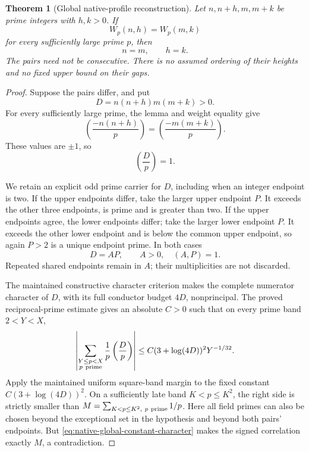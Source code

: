 \documentclass[11pt]{article}
\newtheorem{theorem}{Theorem}[section]
\begin{document}
\begin{theorem}[Global native-profile reconstruction]
\label{thm:native-global-inverse}
Let \(n,n+h,m,m+k\) be prime integers with \(h,k>0\).
If
\[
                     W_p(n,h)=W_p(m,k)
\]
for every sufficiently large prime \(p\), then
\[
                              n=m,\qquad h=k.
\]
The pairs need not be consecutive. There is no assumed ordering of
their heights and no fixed upper bound on their gaps.
\end{theorem}
\begin{proof}
Suppose the pairs differ, and put
\[
                         D=n(n+h)m(m+k)>0.
\]
For every sufficiently large prime, the lemma and weight equality give
\[
 \left(\frac{-n(n+h)}p\right)
                      =\left(\frac{-m(m+k)}p\right).
\]
These values are \(\pm1\), so
\begin{equation}\label{eq:native-global-constant-character}
                            \left(\frac Dp\right)=1.
\end{equation}

We retain an explicit odd prime carrier for \(D\), including when an
integer endpoint is two. If the upper endpoints differ, take the
larger upper endpoint \(P\). It exceeds the other three endpoints,
is prime and is greater than two. If the upper endpoints agree,
the lower endpoints differ; take the larger lower endpoint \(P\).
It exceeds the other lower endpoint and is below the common upper
endpoint, so again \(P>2\) is a unique endpoint prime.
In both cases
\[
                       D=AP,\qquad A>0,\quad (A,P)=1.
\]
Repeated shared endpoints remain in \(A\); their multiplicities
are not discarded.

The maintained constructive character criterion makes the complete
numerator character of \(D\), with its full conductor budget \(4D\),
nonprincipal. The proved reciprocal-prime estimate gives an absolute
\(C>0\) such that on every prime band \(2<Y<X\),
\[
 \left|\sum_{\substack{Y\le p<X\\p\ {\rm prime}}}
                  \frac1p\left(\frac Dp\right)\right|
       \le C(3+\log(4D))^2Y^{-1/32}.
\]
Apply the maintained uniform square-band margin to the fixed
constant \(C(3+\log(4D))^2\). On a sufficiently late band
\(K<p\le K^2\), the right side is strictly smaller than
\(M=\sum_{K<p\le K^2,\ p\ {\rm prime}}1/p\).
Here all field primes can also be chosen beyond the exceptional
set in the hypothesis and beyond both pairs' endpoints.
But \eqref{eq:native-global-constant-character} makes the signed
correlation exactly \(M\), a contradiction.
\end{proof}
\end{document}
